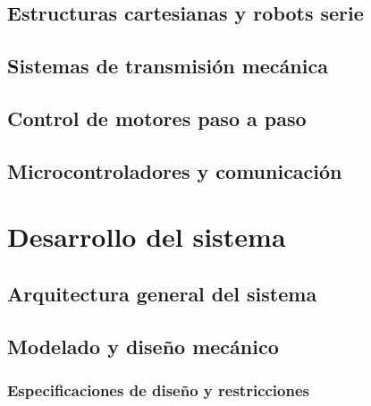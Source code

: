 \documentclass[a4paper,12pt]{report}
\begin{document}
\section{Estructuras cartesianas y robots serie}


\section{Sistemas de transmisión mecánica}


\section{Control de motores paso a paso}

%
%
\section{Microcontroladores y comunicación}

\chapter{Desarrollo del sistema}

\section{Arquitectura general del sistema}





\section{Modelado y diseño mecánico}

\subsection{Especificaciones de diseño y restricciones}

\end{document}

